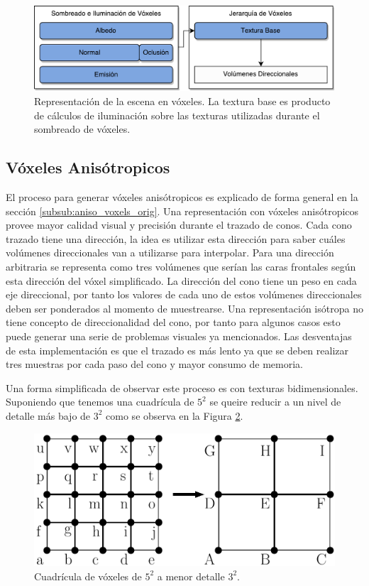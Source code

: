 \begin{figure}[H]
    \centering
    \includegraphics[width=.8\linewidth]{media/representation.pdf}
    \caption{Representación de la escena en vóxeles. La textura base es producto de cálculos de iluminación sobre las texturas utilizadas durante el sombreado de vóxeles.}
    \label{fig:base_texture_imp}
\end{figure}
\subsection{Vóxeles Anisótropicos} %
\label{sub:voxeles_anisotropos}
El proceso para generar vóxeles anisótropicos es explicado de forma general en la sección \ref{subsub:aniso_voxels_orig}. Una representación con vóxeles anisótropicos provee mayor calidad visual y precisión durante el trazado de conos. Cada cono trazado tiene una dirección, la idea es utilizar esta dirección para saber cuáles volúmenes direccionales van a utilizarse para interpolar. Para una dirección arbitraria se representa como tres volúmenes que serían las caras frontales según esta dirección del vóxel simplificado. La dirección del cono tiene un peso en cada eje direccional, por tanto los valores de cada uno de estos volúmenes direccionales deben ser ponderados al momento de muestrearse. Una representación isótropa no tiene concepto de direccionalidad del cono, por tanto para algunos casos esto puede generar una serie de problemas visuales ya mencionados. Las desventajas de esta implementación es que el trazado es más lento ya que se deben realizar tres muestras por cada paso del cono y mayor consumo de memoria.

Una forma simplificada de observar este proceso es con texturas bidimensionales. Suponiendo que tenemos una cuadrícula de $5^2$ se queire reducir a un nivel de detalle más bajo de $3^2$ como se observa en la Figura \ref{fig:filter_objs}.

\begin{figure}[H]
    \centering
    \includegraphics[width=.5\linewidth]{media/filtering_1.pdf}
    \caption{Cuadrícula de vóxeles de $5^2$ a menor detalle $3^2$.}
   	\label{fig:filter_objs}
\end{figure}

